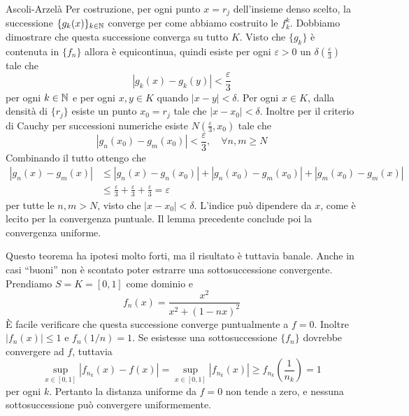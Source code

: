 \documentclass[a4paper]{article}
\begin{document}
\begin{radioactive}
\begin{snippetproof}{Ascoli-Arzelà}
    Per costruzione, per ogni punto \(x=r_j\) dell'insieme denso scelto,
    la successione \(\{g_k(x)\}_{k\in\mathbb{N}}\)
    converge per come abbiamo costruito
    le \(f_k^k\). Dobbiamo dimostrare che questa successione converga su tutto \(K\).
    Visto che \(\{g_k\}\)
    è contenuta in \(\{f_n\}\)
    allora è equicontinua, quindi esiste per ogni \(\varepsilon > 0\) un \(\delta\left(\frac{\varepsilon}{3}\right)\)
    tale che \[ |g_k(x)-g_k(y)|<\frac{\varepsilon}{3}\]
    per ogni \(k \in \mathbb{N}\) e per ogni \(x,y \in K\)
    quando \(|x-y| < \delta\).
    Per ogni \(x\in K\), dalla densità di \(\{r_j\}\) esiste un punto
    \(x_0=r_j\) tale che \(|x-x_0|<\delta\).
    Inoltre per il criterio di Cauchy per successioni numeriche esiste \(N\left(\frac{\varepsilon}{3}, x_0\right)\)
    tale che \[
        |g_n(x_0)- g_m(x_0)| < \frac{\varepsilon}{3}, \quad \forall n,m \geq N
    \]
    Combinando il tutto ottengo che
    \begin{align*}
        |g_n(x)-g_m(x)| &\leq |g_n(x)-g_n(x_0)|+|g_n(x_0)-g_m(x_0)|+|g_m(x_0)-g_m(x)| \\
        &\leq \frac{\varepsilon}{3} + \frac{\varepsilon}{3} + \frac{\varepsilon}{3} = \varepsilon
    \end{align*}
    per tutte le \(n,m > N\), visto che \(|x-x_0| < \delta\).
    L'indice può dipendere da \(x\), come è lecito per la convergenza puntuale. Il lemma precedente conclude poi la convergenza uniforme.
\end{snippetproof}
\end{radioactive}

\begin{radioactive}
\begin{snippetexample}{}
    Questo teorema ha ipotesi molto forti,
    ma il risultato è tuttavia banale.
    Anche in casi ``buoni'' non è scontato poter estrarre una sottosuccessione convergente.
    Prendiamo \(S = K = [0,1]\) come dominio e
    \[
        f_n(x) = \frac{x^2}{x^2 + (1-nx)^2}
    \]
    È facile verificare che questa successione converge puntualmente a \(f=0\).
    Inoltre \(|f_n(x)| \leq 1\)
    e \(f_n(1/n) = 1\).
    Se esistesse una sottosuccessione
    \(\{f_n\}\) dovrebbe convergere ad \(f\), tuttavia
    \[
        \sup_{x\in[0,1]}|f_{n_k}(x)-f(x)|
        =\sup_{x\in[0,1]}|f_{n_k}(x)|
        \geq f_{n_k}\left(\frac1{n_k}\right)=1
    \]
    per ogni \(k\). Pertanto la distanza uniforme da \(f=0\) non tende a zero,
    e nessuna sottosuccessione può convergere uniformemente.
\end{snippetexample}
\end{radioactive}
\end{document}
